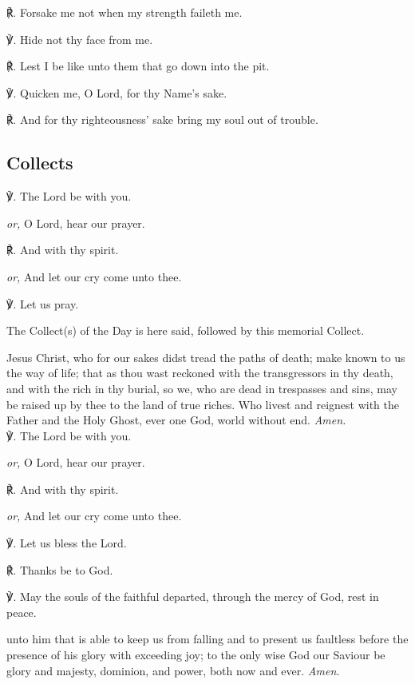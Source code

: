 \begin{multicols}{2}
℟. Forsake me not when my strength faileth me.

℣. Hide not thy face from me.

℟. Lest I be like unto them that go down into the pit.

℣. Quicken me, O Lord, for thy Name's sake.

℟. And for thy righteousness' sake bring my soul out of trouble.

\newcolumn

\subsection{Collects}
℣. The Lord be with you.\par
\textit{or,} O Lord, hear our prayer.

℟. And with thy spirit.\par
\textit{or,} And let our cry come unto thee.

℣. Let us pray.

\begin{rubric}
	The Collect(s) of the Day is here said, followed by this memorial Collect.
\end{rubric}

 Jesus Christ, who for our sakes didst tread the paths of death; make known to us the way of life; that as thou wast reckoned with the transgressors in thy death, and with the rich in thy burial, so we, who are dead in trespasses and sins, may be raised up by thee to the land of true riches. Who livest and reignest with the Father and the Holy Ghost, ever one God, world without end. \textit{Amen.}\\

℣. The Lord be with you.\par
\textit{or,} O Lord, hear our prayer.

℟. And with thy spirit.\par
\textit{or,} And let our cry come unto thee.

℣. Let us bless the Lord.

℟. Thanks be to God.

℣. May the souls {} of the faithful departed, through the mercy of God, rest in peace.

 unto him that is able to keep us from falling and to present us faultless before the presence of his glory with exceeding joy; to the only wise God our Saviour be glory and majesty, dominion, and power, both now and ever. \textit{Amen.}

\end{multicols}

